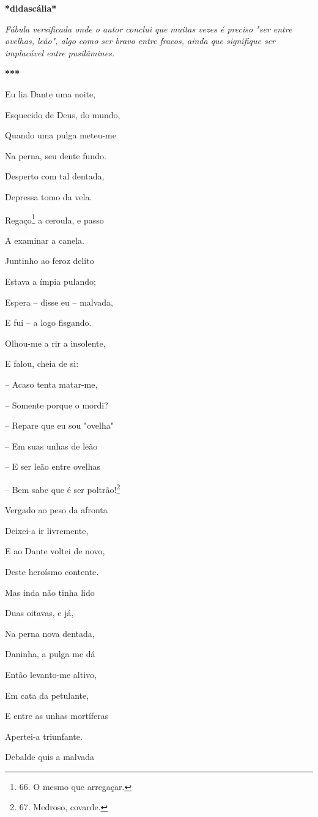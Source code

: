 \textbf{*didascália*}

\emph{Fábula versificada onde o autor conclui que muitas vezes é preciso
"ser entre ovelhas, leão", algo como ser bravo entre fracos, ainda que
signifique ser implacável entre pusilâmines.}

\textbf{***}

Eu lia Dante uma noite,

Esquecido de Deus, do mundo,

Quando uma pulga meteu-me

Na perna, seu dente fundo.

Desperto com tal dentada,

Depressa tomo da vela.

Regaço\footnote{66. O mesmo que arregaçar.} a ceroula, e passo

A examinar a canela.

Juntinho ao feroz delito

Estava a ímpia pulando;

Espera -- disse eu -- malvada,

E fui -- a logo fisgando.

Olhou-me a rir a insolente,

E falou, cheia de si:

-- Acaso tenta matar-me,

-- Somente porque o mordi?

-- Repare que eu sou "ovelha"

-- Em suas unhas de leão

-- E ser leão entre ovelhas

-- Bem sabe que é ser poltrão!\footnote{67. Medroso, covarde.}

Vergado ao peso da afronta

Deixei-a ir livremente,

E ao Dante voltei de novo,

Deste heroísmo contente.

Mas inda não tinha lido

Duas oitavas, e já,

Na perna nova dentada,

Daninha, a pulga me dá

Então levanto-me altivo,

Em cata da petulante,

E entre as unhas mortíferas

Apertei-a triunfante.

Debalde quis a malvada

